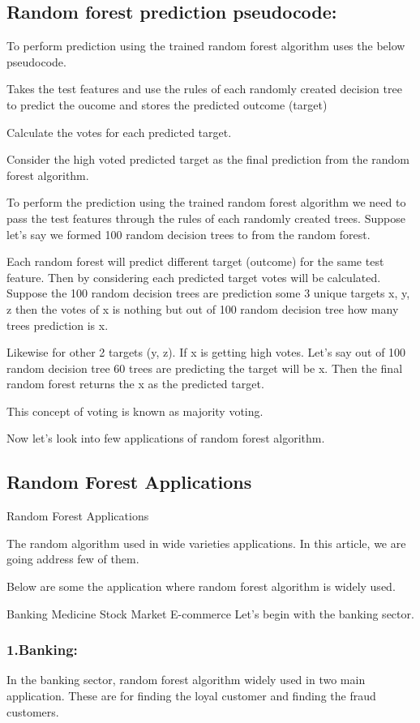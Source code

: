 \documentclass[a4paper,12pt]{article}
\begin{document}
\subsection*{Random forest prediction pseudocode:}
To perform prediction using the trained random forest algorithm uses the below pseudocode.

Takes the test features and use the rules of each randomly created decision tree to predict the oucome and stores the predicted outcome (target)

Calculate the votes for each predicted target.

Consider the high voted predicted target as the final prediction from the random forest algorithm.

To perform the prediction using the trained random forest algorithm we need to pass the test features through the rules of each randomly created trees. Suppose let’s say we formed 100 random decision trees to from the random forest.

Each random forest will predict different target (outcome) for the same test feature. Then by considering each predicted target votes will be calculated. Suppose the 100 random decision trees are prediction some 3 unique targets x, y, z then the votes of x is nothing but out of 100 random decision tree how many trees prediction is x.

Likewise for other 2 targets (y, z). If x is getting high votes. Let’s say out of 100 random decision tree 60 trees are predicting the target will be x. Then the final random forest returns the x as the predicted target.

This concept of voting is known as majority voting.

Now let’s look into few applications of random forest algorithm.


\subsection*{Random Forest Applications}
Random Forest Applications

The random algorithm used in wide varieties applications. In this article, we are going address few of them.

Below are some the application where random forest algorithm is widely used.

Banking
Medicine
Stock Market
E-commerce
Let’s begin with the banking sector.

\subsubsection*{1.Banking:}
In the banking sector, random forest algorithm widely used in two main application. These are for finding the loyal customer and finding the fraud customers.
\end{document}
